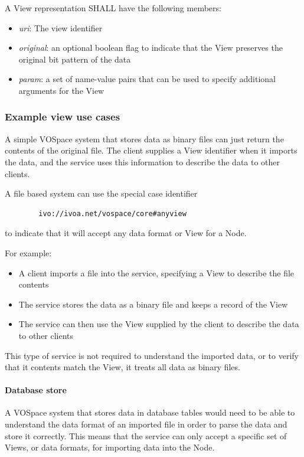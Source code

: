 \documentclass[11pt,a4paper]{ivoa}
\begin{document}
A View representation SHALL have the following members:

\begin{itemize}
    \item \emph{uri}: The view identifier
    \item \emph{original}: an optional boolean flag to indicate that the View preserves the original bit pattern of the data
    \item \emph{param}: a set of name-value pairs that can be used to specify additional arguments for the View
\end{itemize}

\subsubsection{Example view use cases}
\label{subsubsec:example view use cases}
A simple VOSpace system that stores data as binary files can just return the contents of the original file. The client supplies a View identifier when it imports the data, and the service uses this information to describe the data to other clients.

A file based system can use the special case identifier
\begin{verbatim}
        ivo://ivoa.net/vospace/core#anyview
\end{verbatim}
to indicate that it will accept any data format or View for a Node.

For example:

\begin{itemize}
    \item A client imports a file into the service, specifying a View to describe the file contents
    \item The service stores the data as a binary file and keeps a record of the View
    \item The service can then use the View supplied by the client to describe the data to other clients
\end{itemize}

This type of service is not required to understand the imported data, or to verify that it contents match the View, it treats all data as binary files.

\paragraph{Database store}
A VOSpace system that stores data in database tables would need to be able to understand the data format of an imported file in order to parse the data and store it correctly. This means that the service can only accept a specific set of Views, or data formats, for importing data into the Node.
\end{document}
